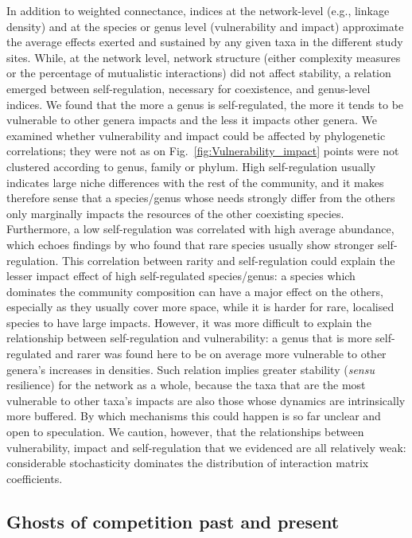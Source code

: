 \documentclass[10pt]{article}
\begin{document}
In addition to weighted connectance, indices at the network-level
(e.g., linkage density) and at the species or genus level (vulnerability
and impact) approximate the average effects exerted and sustained
by any given taxa in the different study sites. While, at the network
level, network structure (either complexity measures or the percentage
of mutualistic interactions) did not affect stability, a relation
emerged between self-regulation, necessary for coexistence, and genus-level
indices. We found that the more a genus is self-regulated, the more
it tends to be vulnerable to other genera impacts and the less it
impacts other genera. We examined whether vulnerability
and impact could be affected by phylogenetic correlations; they were
not as on Fig.~\ref{fig:Vulnerability_impact} points were not clustered
according to genus, family or phylum. High self-regulation usually indicates large
niche differences with the rest of the community, and it makes therefore
sense that a species/genus whose needs strongly differ from the others
only marginally impacts the resources of the other coexisting species.
Furthermore, a low self-regulation was correlated with high average
abundance, which echoes findings by \citet{yenni_persistent_2017}
who found that rare species usually show stronger self-regulation.
This correlation between rarity and self-regulation could explain
the lesser impact effect of high self-regulated species/genus: a species
which dominates the community composition can have a major effect
on the others, especially as they usually cover more space, while
it is harder for rare, localised species to have large impacts. However,
it was more difficult to explain the relationship between self-regulation
and vulnerability: a genus that is more self-regulated and rarer was
found here to be on average more vulnerable to other genera's increases
in densities. Such relation implies greater stability (\emph{sensu}
resilience) for the network as a whole, because the taxa that are
the most vulnerable to other taxa's impacts are also those whose dynamics
are intrinsically more buffered. By which mechanisms this could happen
is so far unclear and open to speculation. We caution, however, that
the relationships between vulnerability, impact and self-regulation
that we evidenced are all relatively weak: considerable stochasticity
dominates the distribution of interaction matrix coefficients.

\subsection*{Ghosts of competition past and present}
\end{document}

